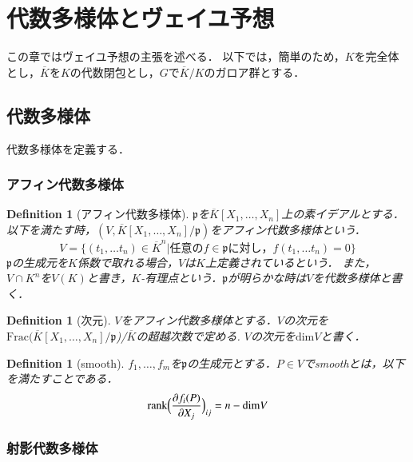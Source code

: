 \documentclass{ujarticle}
\newtheorem{dfn}[thm]{Definition}
\begin{document}
\section{代数多様体とヴェイユ予想}
\label{sec:代数多様体とヴェイユ予想}
この章ではヴェイユ予想の主張を述べる．
以下では，簡単のため，$K$を完全体とし，$\overline{K}$を$K$の代数閉包とし，$G$で$\overline{K}/K$のガロア群とする．

\subsection{代数多様体}
\label{sub:代数多様体}
代数多様体を定義する．
\subsubsection{アフィン代数多様体}
\label{subs:アフィン代数多様体}

\begin{dfn}[アフィン代数多様体]
$\mathfrak{p}$を$\overline{K}[X_1,\dots,X_n]$上の素イデアルとする．以下を満たす時，$(V,\overline{K}[X_1,\dots,X_n]/\mathfrak{p})$をアフィン代数多様体という．
\begin{equation*}
  V = \{ (t_1, \dots t_n) \in {\overline{K}}^n | \mbox{任意の}f \in \mathfrak{p} \mbox{に対し，}f(t_1, \dots t_n)=0 \}
\end{equation*}
$\mathfrak{p}$の生成元を$K$係数で取れる場合，$V$は$K$上定義されているという．
また，$V \cap K^n$を$V(K)$と書き，$K$-有理点という．$\mathfrak{p}$が明らかな時は$V$を代数多様体と書く．
\end{dfn}

\begin{dfn}[次元]
$V$をアフィン代数多様体とする．$V$の次元を$\mathrm{Frac}(\overline{K}[X_1,\dots,X_n]/\mathfrak{p}$)/$\overline{K}$の超越次数で定める.
$V$の次元を$\mathrm{dim}V$と書く．
\end{dfn}

\begin{dfn}[smooth]
  $f_1,\dots,f_m$を$\mathfrak{p}$の生成元とする．$P \in V$でsmoothとは，以下を満たすことである．
  \begin{equation*}
    \mathrm{rank}\Bigl(\frac{ \partial f_i(P)}{ \partial X_j} \Bigr)_{ij} = n - \mathrm{dim}V
  \end{equation*}
\end{dfn}

\subsubsection{射影代数多様体}
\label{subs:射影代数多様体}
\end{document}
